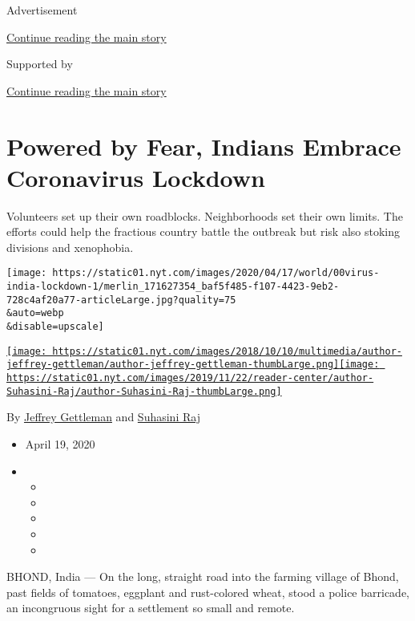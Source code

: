 Advertisement

\protect\hyperlink{after-top}{Continue reading the main story}

Supported by

\protect\hyperlink{after-sponsor}{Continue reading the main story}

\hypertarget{powered-by-fear-indians-embrace-coronavirus-lockdown}{%
\section{Powered by Fear, Indians Embrace Coronavirus
Lockdown}\label{powered-by-fear-indians-embrace-coronavirus-lockdown}}

Volunteers set up their own roadblocks. Neighborhoods set their own
limits. The efforts could help the fractious country battle the outbreak
but risk also stoking divisions and xenophobia.

\texttt{[image: https://static01.nyt.com/images/2020/04/17/world/00virus-india-lockdown-1/merlin\_171627354\_baf5f485-f107-4423-9eb2-728c4af20a77-articleLarge.jpg?quality=75\\\&auto=webp\\\&disable=upscale]}

\href{https://www.nytimes.com/by/jeffrey-gettleman}{\texttt{[image: https://static01.nyt.com/images/2018/10/10/multimedia/author-jeffrey-gettleman/author-jeffrey-gettleman-thumbLarge.png]}}\href{https://www.nytimes.com/by/suhasini-raj}{\texttt{[image: https://static01.nyt.com/images/2019/11/22/reader-center/author-Suhasini-Raj/author-Suhasini-Raj-thumbLarge.png]}}

By \href{https://www.nytimes.com/by/jeffrey-gettleman}{Jeffrey
Gettleman} and \href{https://www.nytimes.com/by/suhasini-raj}{Suhasini
Raj}

\begin{itemize}
\item
  April 19, 2020
\item
  \begin{itemize}
  \item
  \item
  \item
  \item
  \item
  \end{itemize}
\end{itemize}

BHOND, India --- On the long, straight road into the farming village of
Bhond, past fields of tomatoes, eggplant and rust-colored wheat, stood a
police barricade, an incongruous sight for a settlement so small and
remote.

